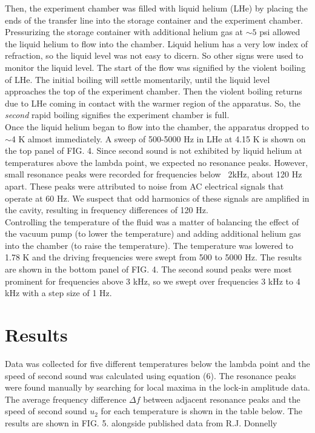 \documentclass[prb,aps,twocolumn,showpacs,10pt]{revtex4-1}
\begin{document}
Then, the experiment chamber was filled with liquid helium (LHe) by placing the ends of the transfer line into the storage container and the experiment chamber. Pressurizing the storage container with additional helium gas at $\sim 5$ psi allowed the liquid helium to flow into the chamber. Liquid helium has a very low index of refraction, so the liquid level was not easy to dicern. So other signs were used to monitor the liquid level. The start of the flow was signified by the violent boiling of LHe.  The initial boiling will settle momentarily, until the liquid level approaches the top of the experiment chamber. Then the violent boiling returns due to LHe coming in contact with the warmer region of the apparatus. So, the \textit{second} rapid boiling signifies the experiment chamber is full. \\

Once the liquid helium began to flow into the chamber, the apparatus dropped to $\sim$4 K almost immediately. A sweep of 500-5000 Hz in LHe at 4.15 K is shown on the top panel of FIG. 4. Since second sound is not exhibited by liquid helium at temperatures above the lambda point, we expected no resonance peaks. However, small resonance peaks were recorded for frequencies below ~2kHz, about 120 Hz apart. These peaks were attributed to noise from AC electrical signals that operate at 60 Hz. We suspect that odd harmonics of these signals are amplified in the cavity, resulting in frequency differences of 120 Hz. \\


Controlling the temperature of the fluid was a matter of balancing the effect of the vacuum pump (to lower the temperature) and adding additional helium gas into the chamber (to raise the temperature). The temperature was lowered to 1.78 K and the driving frequencies were swept from 500 to 5000 Hz. The results are shown in the bottom panel of FIG. 4. The second sound peaks were most prominent for frequencies above 3 kHz, so we swept over frequencies 3 kHz to 4 kHz with a step size of 1 Hz.


\section{Results}

Data was collected for five different temperatures below the lambda point and the speed of second sound was calculated using equation (6). The resonance peaks were found manually by searching for local maxima in the lock-in amplitude data. The average frequency difference $\Delta f$ between adjacent resonance peaks and the speed of second sound $u_2$ for each temperature is shown in the table below. The results are shown in FIG. 5. alongside published data from R.J. Donnelly \cite{donnelly.} 
\end{document}
